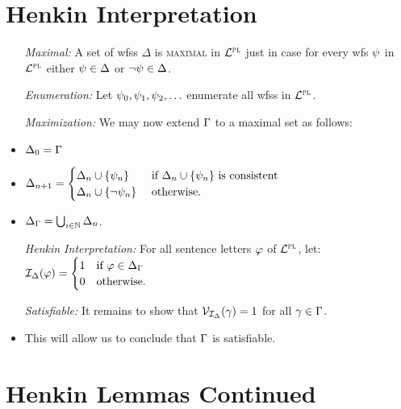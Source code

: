 \documentclass[a4paper, 11pt]{article} %
\begin{document}
\section*{Henkin Interpretation}

\begin{itemize}
  \item[\it Maximal:] A set of wfss $\Delta$ is \textsc{maximal} in $\mathcal{L}^{\textsc{pl}}$ just in case for every wfs $\psi$ in $\mathcal{L}^{\textsc{pl}}$ either $\psi\in\Delta$ or $\neg\psi\in\Delta$.
  \item[\it Enumeration:] Let $\psi_0,\psi_1,\psi_2,\ldots$ enumerate all wfss in $\mathcal{L}^{\textsc{pl}}$.
  \item[\it Maximization:] We may now extend $\Gamma$ to a maximal set as follows: 
    \item $\Delta_0 = \Gamma$
    \item $\Delta_{n+1} =
      \begin{cases}
        \Delta_n\cup\lbrace\psi_n\rbrace      & \text{ if } \Delta_n\cup\lbrace\psi_n\rbrace \text{ is consistent}\\
        \Delta_n\cup\lbrace\neg\psi_n\rbrace  & \text{ otherwise}.
      \end{cases}$
    \item $\Delta_{\Gamma} = \bigcup_{i\in\mathbb{N}}\Delta_n$. 
  \item[\it Henkin Interpretation:] For all sentence letters $\varphi$ of $\mathcal{L}^{\textsc{pl}}$, let:~~ $\mathcal{I}_{\Delta}(\varphi) = 
    \begin{cases}
      1 & \text{if } \varphi \in \Delta_{\Gamma}\\
      0 & \text{otherwise.}
    \end{cases}$
  \item[\it Satisfiable:] It remains to show that $\mathcal{V}_{\mathcal{I}_{\Delta}}(\gamma) = 1$ for all $\gamma \in \Gamma$. 
    \item This will allow us to conclude that $\Gamma$ is satisfiable.  
\end{itemize}





  
\section*{Henkin Lemmas Continued}%
    
\end{document}
